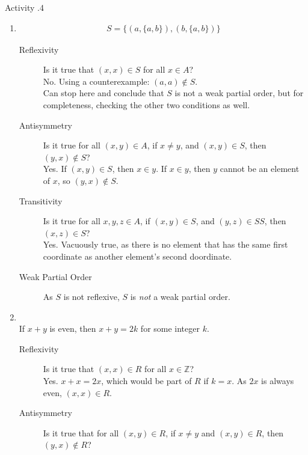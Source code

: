 \documentclass[../notes.tex]{subfiles}
\begin{document}
				\begin{exercise}{Activity \thechapter.4}
					\begin{enumerate}[label=(\alph*)]
						\item {}
							\begin{align*}
								S = \bigl\{(a, \{a, b\}), (b, \{a, b\})\bigr\}
							\end{align*}
							\begin{description}
								\item[Reflexivity] Is it true that $(x, x) \in S$ for all $x \in A$?\\
									No. Using a counterexample: $(a, a) \notin S$.\\
									Can stop here and conclude that $S$ is not a weak partial order, but for completeness, checking the other two conditions as well.
								\item[Antisymmetry] Is it true for all $(x, y) \in A$, if $x \neq y$, and $(x, y) \in S$, then $(y, x) \notin S$?\\
									Yes. If $(x, y) \in S$, then $x \in y$. If $x \in y$, then $y$ cannot be an element of $x$, so $(y, x) \notin S$.
								\item[Transitivity] Is it true for all $x, y, z \in A$, if $(x, y) \in S$, and $(y, z) \in SS$, then $(x, z) \in S$?\\
									Yes. Vacuously true, as there is no element that has the same first coordinate as another element's second doordinate.
								\item[Weak Partial Order] As $S$ is not reflexive, $S$ is \emph{not} a weak partial order.
							\end{description}
						\item {}\\
							If $x + y$ is even, then $x + y = 2k$ for some integer $k$.
							\begin{description}
								\item[Reflexivity] Is it true that $(x, x) \in R$ for all $x \in \mathbb{Z}$?\\
									Yes. $x + x = 2x$, which would be part of $R$ if $k = x$. As $2x$ is always even, $(x, x) \in R$.
								\item[Antisymmetry] Is it true that for all $(x, y) \in R$, if $x \neq y$ and $(x, y) \in R$, then $(y, x) \notin R$?\\

\end{description}
\end{enumerate}
\end{exercise}
\end{document}
